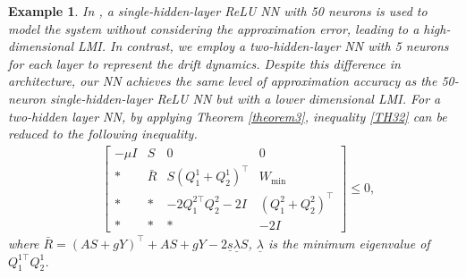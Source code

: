 \documentclass[journal,twoside,web]{ieeecolor}
\newtheorem{example}		[theorem]{Example}
\begin{document}
\begin{example}
In \cite{samanipour2023stability}, a single-hidden-layer ReLU NN with 50 neurons is used to model the system without considering the approximation error, leading to a high-dimensional LMI. In contrast, we employ a two-hidden-layer NN with 5 neurons for each layer to represent the drift dynamics. Despite this difference in architecture, our NN achieves the same level of approximation accuracy as the 50-neuron single-hidden-layer ReLU NN but with a lower dimensional LMI. For a two-hidden layer NN, by applying Theorem \ref{theorem3}, inequality \eqref{TH32} can be reduced to the following inequality.
\begin{equation}\label{le31}
\begin{aligned}
&\begin{bmatrix}
-\mu I&S &0&0\\\ast&\bar{R}&S(Q^1_1+Q^1_2)^\top&W_{\min}\\\ast&\ast&-2Q_1^{2\top}Q_2^2-2I&(Q_1^2+Q_2^2)^\top\\
\ast&\ast&\ast& -2I
\end{bmatrix}\leq 0,
\end{aligned}
\end{equation}
where $\bar{R}=(AS+gY)^\top + AS + gY-2\underline{s} \underline{\lambda}S$, $\underline{\lambda}$ is the minimum eigenvalue of $Q^{1\top}_1 Q^1_2$.


\end{example}
\end{document}
